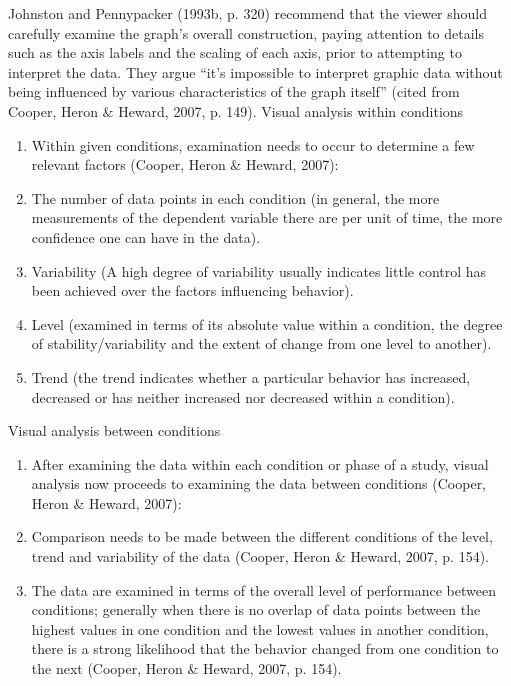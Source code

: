 Johnston and Pennypacker (1993b, p. 320) recommend that the viewer should carefully examine the graph's overall construction, paying attention to details such as the axis labels and the scaling of each axis, prior to attempting to interpret the data. They argue ``it's impossible to interpret graphic data without being influenced by various characteristics of the graph itself'' (cited from Cooper, Heron \& Heward, 2007, p. 149).
%
Visual analysis within conditions\\
\begin{enumerate}
\item Within given conditions, examination needs to occur to determine a few relevant factors (Cooper, Heron \& Heward, 2007):
\item The number of data points in each condition (in general, the more measurements of the dependent variable there are per unit of time, the more confidence one can have in the data).
\item Variability (A high degree of variability usually indicates little control has been achieved over the factors influencing behavior).
\item Level (examined in terms of its absolute value within a condition, the degree of stability/variability and the extent of change from one level to another).
\item Trend (the trend indicates whether a particular behavior has increased, decreased or has neither increased nor decreased within a condition).
\end{enumerate}

Visual analysis between conditions\\
\begin{enumerate}
\item After examining the data within each condition or phase of a study, visual analysis now proceeds to examining the data between conditions (Cooper, Heron \& Heward, 2007):
\item Comparison needs to be made between the different conditions of the level, trend and variability of the data (Cooper, Heron \& Heward, 2007, p. 154).
\item The data are examined in terms of the overall level of performance between conditions; generally when there is no overlap of data points between the highest values in one condition and the lowest values in another condition, there is a strong likelihood that the behavior changed from one condition to the next (Cooper, Heron \& Heward, 2007, p. 154).
\end{enumerate}

